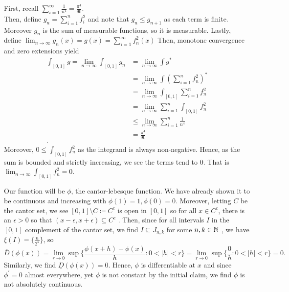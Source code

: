 \documentclass[a4paper]{article}
\begin{document}
\newpage
\begin{problem}[35]
	First, recall \(\sum_{i= 1}^{\infty} \frac{1}{n^{4} } = \frac{\pi^{4}}{90}\).\\
	Then, define \(g_{n} = \sum_{i= 1}^{n} f_{i}^2\) and note that \(g_{n} \le g_{n+1}\) as each term is finite. Moreover \(g_{n}\) is the sum of measurable functions, so it is measurable. Lastly, define \(\lim_{n \to \infty}g_{n}\left( x \right) = g\left( x \right)  = \sum_{i= 1}^{\infty} f_{n}^2\left( x \right) \) Then, monotone convergence  and zero extensions yield
	\begin{align*}
		\int_{\left[ 0, 1 \right] } g = \lim_{n \to \infty} \int_{\left[ 0, 1 \right] }g_{n}
		&= \lim_{n \to \infty}\int g^{*} \\
		&= \lim_{n \to \infty} \int (\sum_{i= 1}^{n} f_{n}^2)^{*} \\
		&= \lim_{n \to \infty} \int_{\left[ 0, 1 \right] } \sum_{i= 1}^{n} f_{n}^2 \\
		&= \lim_{n \to \infty} \sum_{i= 1}^{n} \int_{\left[ 0, 1 \right] }f_{n}^2 \\
		&\le \lim_{n \to \infty} \sum_{i= 1}^{n} \frac{1}{n^{4}} \\
		&= \frac{\pi^{4}}{90} \\
	.\end{align*}
	Moreover, \(0 \le \int_{\left[ 0, 1 \right] }f_{n}^2\) as the integrand is always non-negative. Hence, as the sum is bounded and strictly increasing, we see the terms tend to \(0\). That is \( \lim_{n \to \infty} \int _{\left[ 0, 1 \right] }f_{n}^2 = 0\).
\end{problem}
\newpage
\begin{problem}[36]
	Our function will be \(\phi\), the cantor-lebesque function. We have already shown it to be continuous and increasing with \(\phi\left( 1 \right) = 1, \phi\left( 0 \right) = 0\). Moreover, letting \(C\) be the cantor set, we see \(\left[ 0, 1 \right] \setminus C \coloneqq C ^{c}\) is open in \(\left[ 0, 1 \right] \) so for all \(x \in C ^{c} \), there is an \(\epsilon > 0\) so that \(\left( x-\epsilon, x+\epsilon \right) \subseteq C ^{c}\) . Then, since for all intervals \(I \)  in the \(\left[ 0, 1 \right] \) complement of the cantor set, we find  \(I \subseteq J_{n, k}\) for some \(n, k \in \mathbb{N}\)  , we have \(\xi(I) = \{\frac{n}{2^{k}}\} \), so \[\overline{D}\left( \phi\left( x \right)  \right)  = \lim_{r \to 0}\sup \{ \frac{ \phi\left( x+h \right) -  \phi\left( x \right) }{h} : 0 < \left| h \right|  < r   \} = \lim_{r \to 0}\sup \{ \frac{0}{h} : 0 < \left| h \right|  <  r\} = 0  .\] Similarly, we find \( \underline{D}  \left( \phi\left( x \right)  \right) = 0\). Hence, \( \phi\) is differentiable at \(x\) and since \( \phi^{\prime} = 0\) almost everywhere, yet \( \phi\) is not constant by the initial claim, we find \( \phi\) is not absolutely continuous.
\end{problem}
\end{document}
